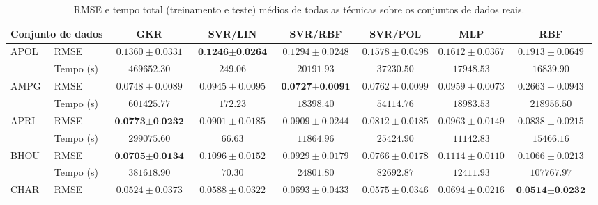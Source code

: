 \begin{landscape}
    \begin{table}
        \centering
        \caption{RMSE e tempo total (treinamento e teste) médios de todas as técnicas sobre os conjuntos de dados reais.}
        \label{tab:results-rmse}
        \begin{tabular}{l|l|c@{\hskip 5pt}c@{\hskip 5pt}c@{\hskip 5pt}c@{\hskip 5pt}c@{\hskip 5pt}c}
            \toprule
            \multicolumn{2}{l}{\textbf{Conjunto de dados}} & \textbf{GKR} & \textbf{SVR/LIN} & \textbf{SVR/RBF} & \textbf{SVR/POL} & \textbf{MLP} & \textbf{RBF} \\
            \midrule
            \multirow{2}{*}{APOL}   & RMSE & $0.1360 \pm 0.0331$ & $\textbf{0.1246} \pm \textbf{0.0264}$ & $0.1294 \pm 0.0248$ & $0.1578 \pm 0.0498$ & $0.1612 \pm 0.0367$ & $0.1913 \pm 0.0649$ \\
                                    & Tempo (s) & $469652.30$ & $249.06$ & $20191.93$ & $37230.50$ & $17948.53$ & $16839.90$ \\
            \midrule
            \multirow{2}{*}{AMPG}   & RMSE & $0.0748 \pm 0.0089$ & $0.0945 \pm 0.0095$ & $\textbf{0.0727} \pm \textbf{0.0091}$ & $0.0762 \pm 0.0099$ & $0.0959 \pm 0.0073$ & $0.2663 \pm 0.0943$ \\
                                    & Tempo (s) & $601425.77$ & $172.23$ & $18398.40$ & $54114.76$ & $18983.53$ & $218956.50$ \\
            \midrule
            \multirow{2}{*}{APRI}   & RMSE & $\textbf{0.0773} \pm \textbf{0.0232}$ & $0.0901 \pm 0.0185$ & $0.0909 \pm 0.0244$ & $0.0812 \pm 0.0185$ & $0.0963 \pm 0.0149$ & $0.0838 \pm 0.0215$ \\
                                    & Tempo (s) & $299075.60$ & $66.63$ & $11864.96$ & $25424.90$ & $11142.83$ & $15466.16$ \\
            \midrule
            \multirow{2}{*}{BHOU}   & RMSE & $\textbf{0.0705} \pm \textbf{0.0134}$ & $0.1096 \pm 0.0152$ & $0.0929 \pm 0.0179$ & $0.0766 \pm 0.0178$ & $0.1114 \pm 0.0110$ & $0.1066 \pm 0.0213$ \\
                                    & Tempo (s) & $381618.90$ & $70.30$ & $24801.80$ & $82692.87$ & $12411.93$ & $107767.97$ \\
            \midrule
            \multirow{2}{*}{CHAR}   & RMSE & $0.0524 \pm 0.0373$ & $0.0588 \pm 0.0322$ & $0.0693 \pm 0.0433$ & $0.0575 \pm 0.0346$ & $0.0694 \pm 0.0216$ & $\textbf{0.0514} \pm \textbf{0.0232}$ \\

\end{tabular}
\end{table}
\end{landscape}
